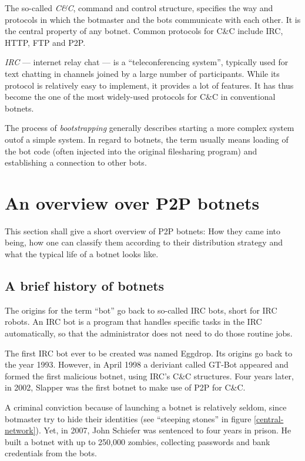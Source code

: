 \documentclass{llncs}
\begin{document}
The so-called {\it C\&C}, command and control structure, specifies
the way and protocols in which the botmaster and the bots communicate
with each other. It is the central property of any botnet. Common
protocols for C\&C include IRC, HTTP, FTP and
P2P.\cite{borgaonkar2010analysis}

{\it IRC} --- internet relay chat --- is a ``teleconferencing
system''\cite{irc}, typically used for text chatting in channels
joined by a large number of participants. While its protocol is
relatively easy to implement, it provides a lot of features. It has
thus become the one of the most widely-used protocols for C\&C in
conventional botnets.

The process of {\it bootstrapping} generally describes starting a more
complex system outof a simple system. In regard to botnets, the
term usually means loading of the bot code (often injected into the
original filesharing program) and establishing a connection to other
bots.\cite{wang2009systematic}


\section{An overview over P2P botnets}
This section shall give a short overview of P2P botnets: How they came
into being, how one can classify them according to their distribution
strategy and what the typical life of a botnet looks like.

\subsection{A brief history of botnets}
The origins for the term ``bot'' go back to so-called IRC bots, short
for IRC robots. An IRC bot is a program that handles specific tasks in
the IRC automatically, so that the administrator does not need to do
those routine jobs.

The first IRC bot ever to be created was named Eggdrop. Its origins go
back to the year 1993. However, in April 1998 a deriviant called
GT-Bot appeared and formed the first malicious botnet, using IRC's
C\&C structures. Four years later, in 2002, Slapper was the first
botnet to make use of P2P for C\&C.\cite{li2009botnet}


 A criminal conviction because of launching a botnet is relatively
 seldom, since botmaster try to hide their identities (see ``steeping
 stones'' in figure \ref{central-network}). Yet, in 2007, John
 Schiefer was sentenced to four years in prison. He built a botnet
 with up to 250,000 zombies, collecting passwords and bank credentials
 from the bots.\cite{BotnetCrime}
\end{document}
